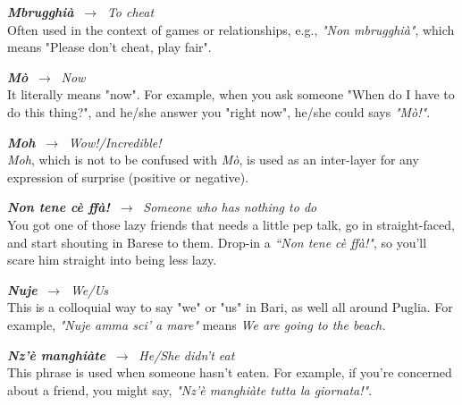 \documentclass[
	openany, %
	parskip=full, %
	12pt, %
	a4paper, %
]{conferencebooklet} %
\begin{document}
\begin{adjustwidth}{10pt}{20pt}
\begin{multicols}{2}
    \RaggedRight
    \textbf{\textit{Mbrugghià}} $\ \rightarrow \ $ \textit{To cheat} \\
    \justifying
    Often used in the context of games or relationships, e.g., \textit{"Non mbrugghià"}, which means "Please don’t cheat, play fair".


    \RaggedRight
    \textbf{\textit{Mò}} $\ \rightarrow \ $ \textit{Now} \\
    \justifying
    It literally means "now". For example, when you ask someone "When do I have to do this thing?", and he/she answer you "right now", he/she could says \textit{"Mò!"}.

    \RaggedRight
    \textbf{\textit{Moh}} $\ \rightarrow \ $ \textit{Wow!/Incredible!} \\
    \justifying
    \textit{Moh}, which is not to be confused with \textit{Mò}, is used as an inter-layer for any expression of surprise (positive or negative).

    \RaggedRight
    \textbf{\textit{Non tene cè ffà!}} $\ \rightarrow \ $  \textit{Someone who has nothing to do} \\
    \justifying
    You got one of those lazy friends that needs a little pep talk, go in straight-faced, and start shouting in Barese to them. Drop-in a \textit{“Non tene cè ffà!"}, so you’ll scare him straight into being less lazy.

    \RaggedRight
    \textbf{\textit{Nuje}} $\ \rightarrow \ $ \textit{We/Us} \\
    \justifying
    This is a colloquial way to say "we" or "us" in Bari, as well all around Puglia. For example, \textit{"Nuje amma sci’ a mare"} means \textit{We are going to the beach.}
    
    \RaggedRight
    \textbf{\textit{Nz’è manghiàte}} $\ \rightarrow \ $ \textit{He/She didn’t eat} \\
    \justifying
    This phrase is used when someone hasn't eaten. For example, if you're concerned about a friend, you might say, \textit{"Nz’è manghiàte tutta la giornata!"}.



\end{multicols}
\end{adjustwidth}
\end{document}

